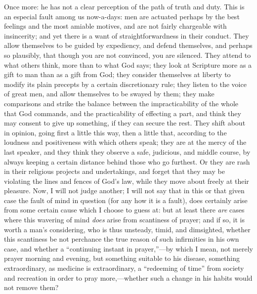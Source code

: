 Once more: he has not a clear perception of the path of truth and
duty. This is an especial fault among us now-a-days: men are actuated
perhaps by the best feelings and the most amiable motives, and are not
fairly chargeable with insincerity; and yet there is a want of
straightforwardness in their conduct. They allow themselves to be
guided by expediency, and defend themselves, and perhaps so plausibly,
that though you are not convinced, you are silenced. They attend to
what others think, more than to what God says; they look at Scripture
more as a gift to man than as a gift from God; they consider
themselves at liberty to modify its plain precepts by a certain
discretionary rule; they listen to the voice of great men, and allow
themselves to be swayed by them; they make comparisons and strike the
balance between the impracticability of the whole that God commands,
and the practicability of effecting a part, and think they may consent
to give up something, if they can secure the rest. They shift about in
opinion, going first a little this way, then a little that, according
to the loudness and positiveness with which others speak; they are at
the mercy of the last speaker, and they think they observe a safe,
judicious, and middle course, by always keeping a certain distance
behind those who go furthest. Or they are rash in their religious
projects and undertakings, and forget that they may be violating the
lines and fences of God's law, while they move about freely at their
pleasure. Now, I will not judge another; I will not say that in this
or that given case the fault of mind in question (for any how it is a
fault), does certainly arise from some certain cause which I choose to
guess at: but at least there \emph{are} cases where this wavering of
mind \emph{does} arise from scantiness of prayer; and if so, it is
worth a man's considering, who is thus unsteady, timid, and dimsighted,
whether this scantiness be not perchance the true reason of such
infirmities in his own case, and whether a ``continuing instant in
prayer,''—by which I mean, not merely prayer morning and
evening, but something suitable to his disease, something
extraordinary, as medicine is extraordinary, a ``redeeming of
time'' from society and recreation in order to pray more,—whether
such a change in his habits would not remove them?

